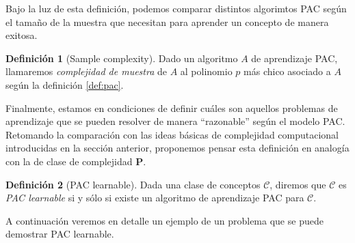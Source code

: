 \documentclass{article}
\theoremstyle{definition}
\newtheorem{definition}{Definici\'on}%
\begin{document}
Bajo la luz de esta definici\'on, podemos comparar distintos algorimtos PAC seg\'un el tama\~no de la muestra que necesitan para aprender un concepto de manera exitosa.

\begin{definition}[Sample complexity]
    Dado un algoritmo $A$ de aprendizaje PAC, llamaremos \emph{complejidad de muestra} de $A$ al polinomio $p$ m\'as chico asociado a $A$ seg\'un la definici\'on \ref{def:pac}.
\end{definition}

Finalmente, estamos en condiciones de definir cu\'ales son aquellos problemas de aprendizaje que se pueden resolver de manera ``razonable'' seg\'un el modelo PAC. Retomando la comparaci\'on con las ideas b\'asicas de complejidad computacional introducidas en la secci\'on anterior, proponemos pensar esta definici\'on en analog\'ia con la de clase de complejidad $\mathbf{P}$.

\begin{definition}[PAC learnable]
    Dada una clase de conceptos $\mathcal{C}$, diremos que $\mathcal{C}$ es \emph{PAC learnable} si y s\'olo si existe un algoritmo de aprendizaje PAC para $\mathcal{C}$.
\end{definition}

A continuaci\'on veremos en detalle un ejemplo de un problema que se puede demostrar PAC learnable. 
\end{document}
